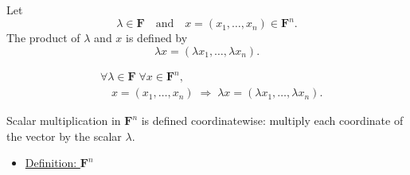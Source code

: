 
\begin{tcolorbox}[colback=defbox, colframe=defborder, arc=2pt,
  left=6pt, right=6pt, top=4pt, bottom=4pt,
  title={\small\textbf{Definition (Scalar Multiplication in $\mathbf{F}^n$)}},
  fonttitle=\small\bfseries]
\begin{definition}
\label{def:scalar-multiplication-in-Fn}
Let
\[
\lambda \in \mathbf{F}
\quad\text{and}\quad
x=(x_1,\dots,x_n)\in \mathbf{F}^n.
\]
The product of $\lambda$ and $x$ is defined by
\[
\lambda x
=
(\lambda x_1,\dots,\lambda x_n).
\]
\end{definition}
\end{tcolorbox}

\begin{remark*}
\[
\begin{aligned}
&\forall \lambda \in \mathbf{F}\;\forall x \in \mathbf{F}^n, \\
&\quad
x=(x_1,\dots,x_n)
\;\Rightarrow\;
\lambda x=(\lambda x_1,\dots,\lambda x_n).
\end{aligned}
\]
\end{remark*}

\begin{remark*}[Interpretation]
Scalar multiplication in $\mathbf{F}^n$ is defined coordinatewise: multiply
each coordinate of the vector by the scalar \(\lambda\).
\end{remark*}

\begin{remark*}[Dependencies]
\begin{itemize}
  \item \hyperref[def:Fn]{Definition: $\mathbf{F}^n$}
\end{itemize}
\end{remark*}

